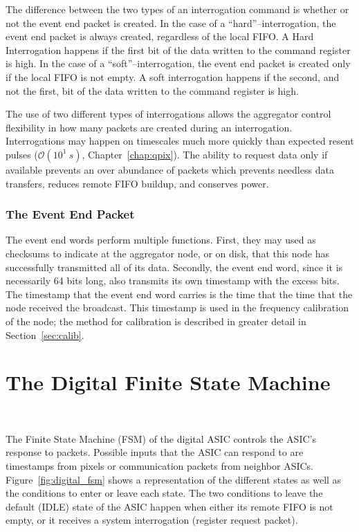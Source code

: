 The difference between the two types of an interrogation command is whether or not the event end packet is created.
In the case of a ``hard''--interrogation, the event end packet is always created, regardless of the local FIFO.
A Hard Interrogation happens if the first bit of the data written to the command register is high.
In the case of a ``soft''--interrogation, the event end packet is created only if the local FIFO is not empty.
A soft interrogation happens if the second, and not the first, bit of the data written to the command register is high.

The use of two different types of interrogations allows the aggregator control flexibility in how many packets are created during an interrogation.
Interrogations may happen on timescales much more quickly than expected resent pulses ($\mathcal{O}(10^{1}~\unit{s})$, Chapter~\ref{chap:qpix}).
The ability to request data only if available prevents an over abundance of packets which prevents needless data transfers, reduces remote FIFO buildup, and conserves power.

\subsubsection{The Event End Packet}

The event end words perform multiple functions.
First, they may used as checksums to indicate at the aggregator node, or on disk, that this node has successfully transmitted all of its data.
Secondly, the event end word, since it is necessarily 64 bits long, also transmits its own timestamp with the excess bits.
The timestamp that the event end word carries is the time that the time that the node received the broadcast.
This timestamp is used in the frequency calibration of the node; the method for calibration is described in greater detail in Section~\ref{sec:calib}.

\section{The Digital Finite State Machine}~\label{sec:digital_fsm}

The Finite State Machine (FSM) of the digital ASIC controls the ASIC's response to packets.
Possible inputs that the ASIC can respond to are timestamps from pixels or communication packets from neighbor ASICs.
Figure~\ref{fig:digital_fsm} shows a representation of the different states as well as the conditions to enter or leave each state.
The two conditions to leave the default (IDLE) state of the ASIC happen when either its remote FIFO is not empty, or it receives a system interrogation (register request packet).

